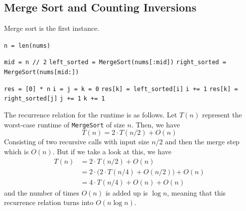 \subsection{Merge Sort and Counting Inversions}

  \begin{algo}
    Merge sort is the first instance. 
    \begin{algorithm}[H]
      \caption{Merge Sort}
      \label{alg:merge_sort}
      \begin{algorithmic}
          \State \texttt{n = len(nums)}

           
            \State {}
          \EndIf
          \State \texttt{mid = n // 2} 
          \State \texttt{left\_sorted = MergeSort(nums[:mid])} 
          \State \texttt{right\_sorted = MergeSort(nums[mid:])} 

          \State \texttt{res = [0] * n} 
          \State \texttt{i = j = k = 0} 
           
              \State \texttt{res[k] = left\_sorted[i]} 
              \State \texttt{i += 1} 
            \Else 
              \State \texttt{res[k] = right\_sorted[j]}
              \State \texttt{j += 1}
            \EndIf 
            \State \texttt{k += 1}
          \EndWhile

          \State {}
        \EndFunction
      \end{algorithmic}
    \end{algorithm}
    The recurrence relation for the runtime is as follows. Let $T(n)$ represent the worst-case runtime of \texttt{MergeSort} of size $n$. Then, we have 
    \begin{equation}
      T(n) = 2 \cdot T(n/2) + O(n)
    \end{equation}
    Consisting of two recursive calls with input size $n/2$ and then the merge step which is $O(n)$. But if we take a look at this, we have 
    \begin{align}
      T(n) & = 2 \cdot T(n/2) + O(n) \\
           & = 2 \cdot \big( 2 \cdot T(n/4) + O(n/2)) + O(n) \\
           & = 4 \cdot T(n/4) + O(n) + O(n) 
    \end{align}
    and the number of times $O(n)$ is added up is $\log{n}$, meaning that this recurrence relation turns into $O(n \log{n})$. 
  \end{algo}


